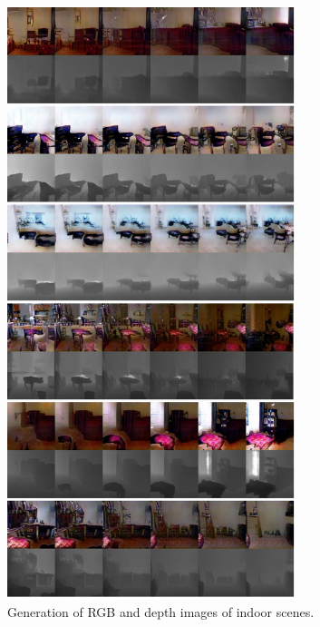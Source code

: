 \begin{figure}[tbh!]
\centering
\includegraphics[trim=0in 0in 0in 0in, width=0.75\textwidth]{result_nyu_big2.pdf}
\caption{Generation of RGB and depth images of indoor scenes.}
\label{fig::result_nyu2}
\end{figure}